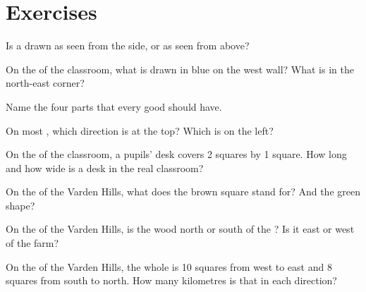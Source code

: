 \section{Exercises}

\begin{exercise}[$\star$]\label{exo:g2:drawing-to-map:1}
Is a  drawn as seen from the side, or as seen from above?
\end{exercise}

\begin{exercise}[$\star$]\label{exo:g2:drawing-to-map:2}
On the  of the classroom, what is drawn in blue on the west wall? What
is in the north-east corner?
\end{exercise}

\begin{exercise}[$\star$]\label{exo:g2:drawing-to-map:3}
Name the four parts that every good  should have.
\end{exercise}

\begin{exercise}[$\star$]\label{exo:g2:drawing-to-map:4}
On most , which direction is at the top? Which is on the left?
\end{exercise}

\begin{exercise}[$\star$]\label{exo:g2:drawing-to-map:5}
On the  of the classroom, a pupils' desk covers 2 squares by 1 square.
How long and how wide is a desk in the real classroom?
\end{exercise}

\begin{exercise}[$\star$]\label{exo:g2:drawing-to-map:6}
On the  of the Varden Hills, what does the brown square stand for? And
the green shape?
\end{exercise}

\begin{exercise}[$\star\star$]\label{exo:g2:drawing-to-map:7}
On the  of the Varden Hills, is the wood north or south of the ?
Is it east or west of the farm?
\end{exercise}

\begin{exercise}[$\star\star$]\label{exo:g2:drawing-to-map:8}
On the  of the Varden Hills, the whole  is 10 squares from west to
east and 8 squares from south to north. How many kilometres is that in each
direction?
\end{exercise}

